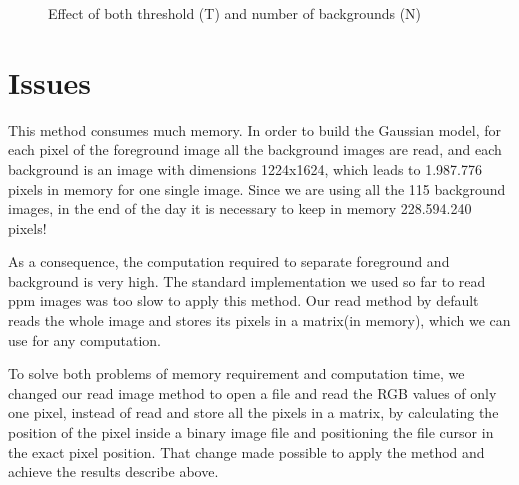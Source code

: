 \documentclass{article}
\begin{document}
	\begin{figure}[H]
		  \centering
		  \caption{Effect of both threshold (T) and number of backgrounds (N)}
		  \label{thresxback}
	\end{figure}
	
\section{Issues}
	This method consumes much memory. In order to build the Gaussian model, for each pixel of the foreground image all the background images are read, and each background is an image with dimensions 1224x1624, which leads to 1.987.776 pixels in memory for one single image. Since we are using all the 115 background images, in the end of the day it is necessary to keep in memory 228.594.240 pixels!

	As a consequence, the computation required to separate foreground and background is very high. The standard implementation we used so far to read ppm images was too slow to apply this method. Our read method by default reads the whole image and stores its pixels in a matrix(in memory), which we can use for any computation.

	To solve both problems of memory requirement and computation time, we changed our read image method to open a file and read the RGB values of only one pixel, instead of read and store all the pixels in a matrix, by calculating the position of the pixel inside a binary image file and positioning the file cursor in the exact pixel position. That change made possible to apply the method and achieve the results describe above.
\end{document}
